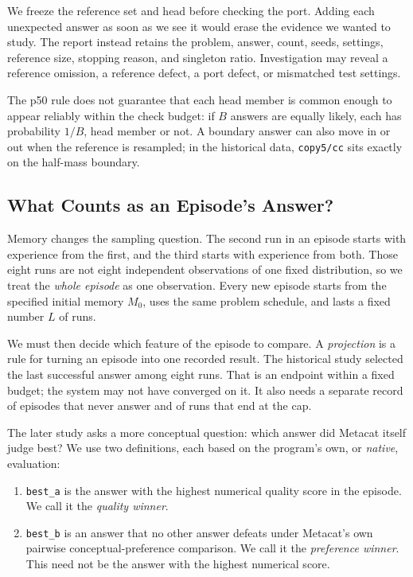 \documentclass[10pt,letterpaper]{article}
\newcommand{\tightlist}{\setlength{\itemsep}{0pt}\setlength{\parskip}{0pt}}
\begin{document}
We freeze the reference set and head before checking the port. Adding each unexpected
answer as soon as we see it would erase the evidence we wanted to study. The report
instead retains the problem, answer, count, seeds, settings, reference size, stopping
reason, and singleton ratio. Investigation may reveal a reference omission, a reference
defect, a port defect, or mismatched test settings.

The p50 rule does not guarantee that each head member is common enough to appear reliably
within the check budget: if \(B\) answers are equally likely, each has probability
\(1/B\), head member or not. A boundary answer can also move in or out when the reference
is resampled; in the historical data, \texttt{copy5/cc} sits exactly on the half-mass
boundary.

\subsection{What Counts as an Episode's Answer?}\label{sec:episode-method}

Memory changes the sampling question. The second run in an episode starts with experience
from the first, and the third starts with experience from both. Those eight runs are not
eight independent observations of one fixed distribution, so we treat the \emph{whole
episode} as one observation. Every new episode starts from the specified initial memory
\(M_0\), uses the same problem schedule, and lasts a fixed number \(L\) of runs.

We must then decide which feature of the episode to compare. A \emph{projection} is a rule
for turning an episode into one recorded result. The historical study selected the last
successful answer among eight runs. That is an endpoint within a fixed budget; the system
may not have converged on it. It also needs a separate record of episodes that never
answer and of runs that end at the cap.

The later study asks a more conceptual question: which answer did Metacat itself judge
best? We use two definitions, each based on the program's own, or \emph{native},
evaluation:

\begin{enumerate}
\def\labelenumi{\arabic{enumi}.}
\tightlist
\item
  \texttt{best\_a} is the answer with the highest numerical quality score in the episode.
  We call it the \emph{quality winner}.
\item
  \texttt{best\_b} is an answer that no other answer defeats under Metacat's own pairwise
  conceptual-preference comparison. We call it the \emph{preference winner}. This need not
  be the answer with the highest numerical score.
\end{enumerate}
\end{document}
